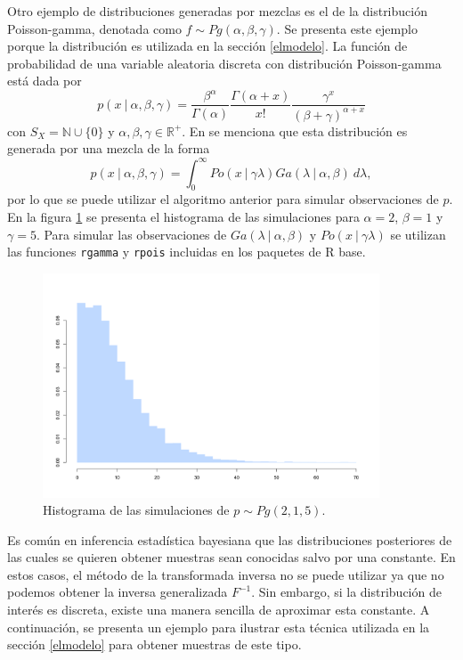 \documentclass[11pt,a4paper]{article}
\begin{document}
Otro ejemplo de distribuciones generadas por mezclas es el de la distribución Poisson-gamma, denotada como $f \sim Pg(\alpha, \beta, \gamma)$. Se presenta este ejemplo porque la distribución es utilizada en la sección \ref{elmodelo}. La función de probabilidad de una variable aleatoria discreta con distribución Poisson-gamma está dada por
\begin{equation}
\label{eq:poga}
p(x \ | \ \alpha, \beta, \gamma) = \frac{\beta ^ \alpha}{\Gamma (\alpha)}\frac{\Gamma (\alpha + x)}{x!}\frac{\gamma ^ x}{(\beta + \gamma) ^ {\alpha + x}}
\end{equation}
con $S_X = \mathbb{N} \cup \lbrace 0 \rbrace$ y $\alpha, \beta, \gamma \in \mathbb{R}^+$. En \citet{bernardo} se menciona que esta distribución es generada por una mezcla de la forma
$$p(x \ | \ \alpha, \beta, \gamma) = \int_0 ^\infty Po(x \ | \ \gamma \lambda) Ga(\lambda \ | \ \alpha, \beta) \ d\lambda,$$ por lo que se puede utilizar el algoritmo anterior para simular observaciones de $p$. En la figura \ref{fig:poga} se presenta el histograma de las simulaciones para $\alpha = 2$, $\beta = 1$ y $\gamma = 5$. Para simular las observaciones de $Ga(\lambda \ | \ \alpha, \beta)$ y $Po(x \ | \ \gamma \lambda)$ se utilizan las funciones \texttt{rgamma} y \texttt{rpois} incluidas en los paquetes de R base.\\

\begin{figure}[h]
\centering\includegraphics[width=10cm]{poisson_gamma.png}
\caption{Histograma de las simulaciones de $p \sim Pg(2, 1, 5)$.}
\label{fig:poga}
\end{figure}

Es común en inferencia estadística bayesiana que las distribuciones posteriores de las cuales se quieren obtener muestras sean conocidas salvo por una constante. En estos casos, el método de la transformada inversa no se puede utilizar ya que no podemos obtener la inversa generalizada $F^{-1}$. Sin embargo, si la distribución de interés es discreta, existe una manera sencilla de aproximar esta constante. A continuación, se presenta un ejemplo para ilustrar esta técnica utilizada en la sección \ref{elmodelo} para obtener muestras de este tipo.\\
\end{document}
